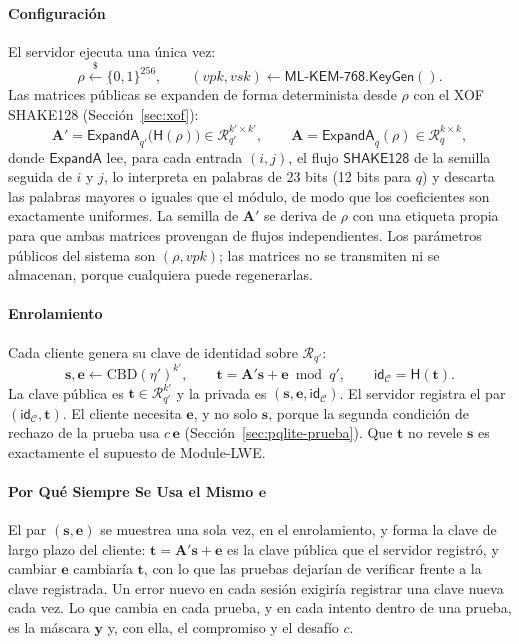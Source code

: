 \paragraph{Configuración}
El servidor ejecuta una única vez:
\begin{equation}
\rho \xleftarrow{\$} \{0,1\}^{256}, \qquad (vpk, vsk) \leftarrow \mathsf{ML\text{-}KEM\text{-}768.KeyGen}().
\end{equation}
Las matrices públicas se expanden de forma determinista desde $\rho$ con el XOF SHAKE128 (Sección~\ref{sec:xof}):
\begin{equation}
\mathbf{A}' = \mathsf{ExpandA}_{q'}\big(\mathsf{H}(\rho)\big) \in \mathcal{R}_{q'}^{k' \times k'}, \qquad
\mathbf{A} = \mathsf{ExpandA}_{q}(\rho) \in \mathcal{R}_{q}^{k \times k},
\end{equation}
donde $\mathsf{ExpandA}$ lee, para cada entrada $(i, j)$, el flujo $\mathsf{SHAKE128}$ de la semilla seguida de $i$ y $j$, lo interpreta en palabras de 23 bits (12 bits para $q$) y descarta las palabras mayores o iguales que el módulo, de modo que los coeficientes son exactamente uniformes. La semilla de $\mathbf{A}'$ se deriva de $\rho$ con una etiqueta propia para que ambas matrices provengan de flujos independientes. Los parámetros públicos del sistema son $(\rho, vpk)$; las matrices no se transmiten ni se almacenan, porque cualquiera puede regenerarlas.

\paragraph{Enrolamiento}
Cada cliente genera su clave de identidad sobre $\mathcal{R}_{q'}$:
\begin{equation}
\mathbf{s}, \mathbf{e} \leftarrow \mathrm{CBD}(\eta')^{k'}, \qquad \mathbf{t} = \mathbf{A}'\mathbf{s} + \mathbf{e} \bmod q', \qquad \mathsf{id}_{\mathcal{C}} = \mathsf{H}(\mathbf{t}).
\end{equation}
La clave pública es $\mathbf{t} \in \mathcal{R}_{q'}^{k'}$ y la privada es $(\mathbf{s}, \mathbf{e}, \mathsf{id}_{\mathcal{C}})$. El servidor registra el par $(\mathsf{id}_{\mathcal{C}}, \mathbf{t})$. El cliente necesita $\mathbf{e}$, y no solo $\mathbf{s}$, porque la segunda condición de rechazo de la prueba usa $c\,\mathbf{e}$ (Sección~\ref{sec:pqlite-prueba}). Que $\mathbf{t}$ no revele $\mathbf{s}$ es exactamente el supuesto de Module-LWE.

\paragraph{Por Qué Siempre Se Usa el Mismo $\mathbf{e}$}
El par $(\mathbf{s}, \mathbf{e})$ se muestrea una sola vez, en el enrolamiento, y forma la clave de largo plazo del cliente: $\mathbf{t} = \mathbf{A}'\mathbf{s} + \mathbf{e}$ es la clave pública que el servidor registró, y cambiar $\mathbf{e}$ cambiaría $\mathbf{t}$, con lo que las pruebas dejarían de verificar frente a la clave registrada. Un error nuevo en cada sesión exigiría registrar una clave nueva cada vez. Lo que cambia en cada prueba, y en cada intento dentro de una prueba, es la máscara $\mathbf{y}$ y, con ella, el compromiso y el desafío $c$.

